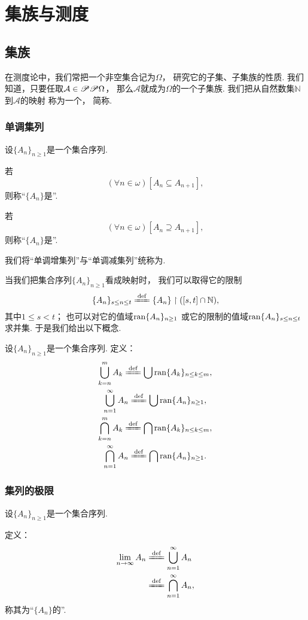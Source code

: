 \chapter{集族与测度}
\section{集族}
在测度论中，我们常把一个非空集合记为\(\Omega\)，
研究它的子集、子集族的性质.
我们知道，只要任取\(\mathcal{A} \in \mathscr{P}\mathscr{P}\Omega\)，
那么\(\mathcal{A}\)就成为\(\Omega\)的一个子集族.
我们把从自然数集\(\mathbb{N}\)到\(\mathcal{A}\)的映射
称为一个，
简称.

\subsection{单调集列}
\begin{definition}
设\(\{A_n\}_{n\geq1}\)是一个集合序列.

若\[
	(\forall n\in\omega)
	[A_n \subseteq A_{n+1}],
\]
则称“\(\{A_n\}\)是”.

若\[
	(\forall n\in\omega)
	[A_n \supseteq A_{n+1}],
\]
则称“\(\{A_n\}\)是”.

我们将“单调增集列”与“单调减集列”统称为.
\end{definition}

当我们把集合序列\(\{A_n\}_{n\geq1}\)看成映射时，
我们可以取得它的限制\[
	\{A_n\}_{s \leq n\leq t}
	\defeq
	\{A_n\}\upharpoonright([s,t]\cap\mathbb{N}),
\]
其中\(1\leq s<t\)；
也可以对它的值域\(\operatorname{ran}\{A_n\}_{n\geq1}\)
或它的限制的值域\(\operatorname{ran}\{A_n\}_{s\leq n\leq t}\)求并集.
于是我们给出以下概念.
\begin{definition}
设\(\{A_n\}_{n\geq1}\)是一个集合序列.
定义：\begin{gather*}
	\bigcup_{k=n}^m A_k
	\defeq
	\bigcup \ran\{A_k\}_{n \leq k \leq m}, \\
	\bigcup_{n=1}^\infty A_n
	\defeq
	\bigcup \ran\{A_n\}_{n\geq1}, \\
	\bigcap_{k=n}^m A_k
	\defeq
	\bigcap \ran\{A_k\}_{n \leq k \leq m}, \\
	\bigcap_{n=1}^\infty A_n
	\defeq
	\bigcap \ran\{A_n\}_{n\geq1}.
\end{gather*}
\end{definition}

\subsection{集列的极限}
\begin{definition}
设\(\{A_n\}_{n\geq1}\)是一个集合序列.

定义：\begin{align*}
	\lim_{n\to\infty} A_n
	&\defeq \bigcup_{n=1}^\infty A_n \\
	&\defeq \bigcap_{n=1}^\infty A_n,
\end{align*}
称其为“\(\{A_n\}\)的”.
\end{definition}

